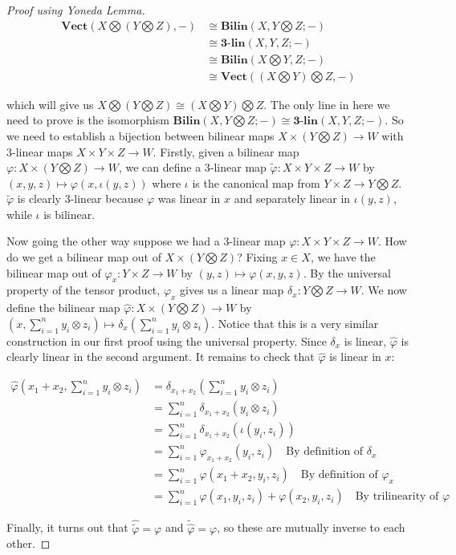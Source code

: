 \documentclass[11pt]{article}
\theoremstyle{definition}
\theoremstyle{plain}
\theoremstyle{plain}
\theoremstyle{plain}
\theoremstyle{definition}
\begin{document}
\begin{proof}[Proof using Yoneda Lemma]
\begin{align*}
\textbf{Vect}(X \bigotimes (Y \bigotimes Z), -) &\cong \textbf{Bilin}(X, Y \bigotimes Z; -) \\
&\cong \textbf{3-lin}(X, Y, Z; -) \\
&\cong \textbf{Bilin}(X \bigotimes Y, Z; -) \\
&\cong \textbf{Vect}((X \bigotimes Y) \bigotimes Z, -)
\end{align*}

which will give us $X \bigotimes (Y \bigotimes Z) \cong (X \bigotimes Y) \bigotimes Z$. The only line in here we need to prove is the isomorphism $\textbf{Bilin}(X, Y \bigotimes Z; -) \cong \textbf{3-lin}(X,Y,Z; -)$. So we need to establish a bijection between bilinear maps $X \times (Y \bigotimes Z) \to W$ with 3-linear maps  $X \times Y \times Z \to W$. Firstly, given a bilinear map $\varphi: X \times (Y \bigotimes Z) \to W$, we can define a 3-linear map $\tilde{\varphi}: X \times Y \times Z \to W$ by $(x,y,z) \mapsto \varphi(x, \iota(y,z))$ where $\iota$ is the canonical map from $Y \times Z \to Y \bigotimes Z$. $\tilde{\varphi}$ is clearly 3-linear because $\varphi$ was linear in $x$ and separately linear in $\iota(y,z)$, while $\iota$ is bilinear.

Now going the other way suppose we had a 3-linear map $\varphi: X \times Y \times Z \to W$. How do we get a bilinear map out of $X \times (Y \bigotimes Z)$? Fixing $x \in X$, we have the bilinear map out of $\varphi_x: Y \times Z \to W$ by $(y,z) \mapsto \varphi(x, y, z)$. By the universal property of the tensor product, $\varphi_x$ gives us a linear map $\delta_x: Y \bigotimes Z \to W$. We now define the bilinear map $\hat{\varphi}: X \times (Y \bigotimes Z) \to W$ by $(x, \sum\limits_{i=1}^{n}y_i \otimes z_i) \mapsto \delta_x(\sum\limits_{i=1}^{n}y_i \otimes z_i)$. Notice that this is a very similar construction in our first proof using the universal property. Since $\delta_x$ is linear, $\hat{\varphi}$ is clearly linear in the second argument. It remains to check that $\hat{\varphi}$ is linear in $x$:

\begin{align*}
\hat{\varphi}(x_1 + x_2, \sum\limits_{i=1}^{n}y_i \otimes z_i) &= \delta_{x_1 + x_2}(\sum\limits_{i=1}^{n}y_i \otimes z_i) \\
&= \sum\limits_{i=1}^{n}\delta_{x_1 + x_2}(y_i \otimes z_i) \\
&= \sum\limits_{i=1}^{n}\delta_{x_1 + x_2}(\iota(y_i, z_i)) \\
&= \sum\limits_{i=1}^{n}\varphi_{x_1 + x_2}(y_i, z_i) \quad \text{By definition of $\delta_x$} \\
&= \sum\limits_{i=1}^{n}\varphi(x_1 + x_2, y_i, z_i) \quad \text{By definition of $\varphi_x$} \\
&= \sum\limits_{i=1}^{n}\varphi(x_1, y_i, z_i) + \varphi(x_2, y_i, z_i) \quad \text{By trilinearity of $\varphi$}
\end{align*}

Finally, it turns out that $\hat{\tilde{\varphi}} = \varphi$ and $\tilde{\hat{\varphi}} = \varphi$, so these are mutually inverse to each other.
\end{proof}

\nocite{*}


\end{document}
